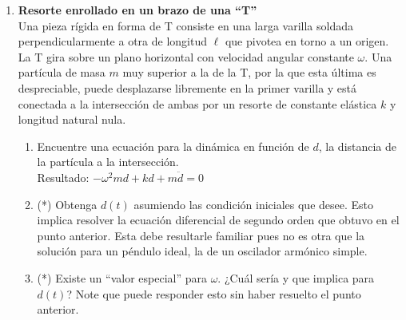 \documentclass[11pt, a4paper, twoside]{article}
\begin{document}
\begin{enumerate}
\item
	\begin{minipage}[t][3.9cm]{0.75\textwidth}
		\textbf{Resorte enrollado en un brazo de una ``T''}\\
		Una pieza rígida en forma de T consiste en una larga varilla soldada perpendicularmente a otra de longitud \(\ell\) que pivotea en torno a un origen.
		La T gira sobre un plano horizontal con velocidad angular constante \(\omega\).
		Una partícula de masa \(m\) muy superior a la de la T, por la que esta última es despreciable, puede desplazarse libremente en la primer varilla y está conectada a la intersección de ambas por un resorte de constante elástica \(k\) y longitud natural nula.
	\end{minipage}
	\begin{minipage}[c][1cm][t]{0.3\textwidth}
		
	\end{minipage}
	\begin{enumerate}
		\item  Encuentre una ecuación para la dinámica en función de \(d\), la distancia de la partícula a la intersección.\\
		Resultado: \(- \omega^{2} m d + k d + m \ddot{d} = 0\)
		\item (*) Obtenga \(d(t)\) asumiendo las condición iniciales que desee. Esto implica resolver la ecuación diferencial de segundo orden que obtuvo en el punto anterior.
			Esta debe resultarle familiar pues no es otra que la solución para un péndulo ideal, la de un oscilador armónico simple.
		\item (*) Existe un ``valor especial'' para \(\omega\). ¿Cuál sería y que implica para \(d(t)\)? Note que puede responder esto sin haber resuelto el punto anterior.
	\end{enumerate}


\end{enumerate}
\end{document}
